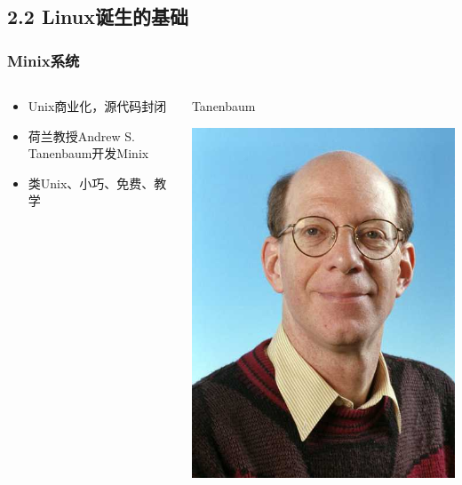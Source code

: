 \documentclass[xcolor=svgnames,bigger,presentation]{beamer}
\begin{document}
\subsection{2.2 Linux诞生的基础}
\label{sec-2-2}
\begin{frame}
\frametitle{Minix系统}
\label{sec-2-2-1}
\begin{columns}
\begin{column}{0.6\textwidth}
\label{sec-2-2-1-1}
\begin{itemize}

\item Unix商业化，源代码封闭
\label{sec-2-2-1-2}%

\item 荷兰教授Andrew S. Tanenbaum开发Minix
\label{sec-2-2-1-3}%

\item 类Unix、小巧、免费、教学
\label{sec-2-2-1-4}%
\end{itemize} %
\end{column}
\begin{column}{0.4\textwidth}
\begin{exampleblock}{Tanenbaum}
\label{sec-2-2-1-5}

\includegraphics[width=1\textwidth]{img/ast.jpg}
\end{exampleblock}
\end{column}
\end{columns}
\end{frame}
\end{document}
